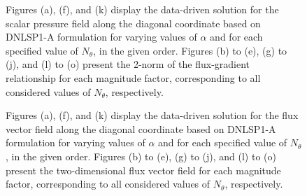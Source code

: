 \begin{figure}[h!]
	\centering
	\caption{Figures (a), (f), and (k) display the data-driven solution for the scalar pressure field along the diagonal coordinate based on DNLSP1-A formulation for varying values of $\alpha$ and for each specified value of $N_{\theta}$, in the given order. Figures (b) to (e), (g) to (j), and (l) to (o) present the 2-norm of the flux-gradient relationship for each magnitude factor, corresponding to all considered values of $N_{\theta}$, respectively.}
	\def\svgwidth{\columnwidth}  
	  
	\label{fig:compound_noise_u}  
\end{figure}

\begin{figure}[h!]
	\centering
	\caption{Figures (a), (f), and (k) display the data-driven solution for the flux vector field along the diagonal coordinate based on DNLSP1-A formulation for varying values of $\alpha$ and for each specified value of $N_{\theta}$, in the given order. Figures (b) to (e), (g) to (j), and (l) to (o) present the two-dimensional flux vector field for each magnitude factor, corresponding to all considered values of $ N_{\theta} $, respectively.  }
	\def\svgwidth{\columnwidth}  
	  
	\label{fig:compound_noise_s}  
\end{figure}





%	  
%
%	  



